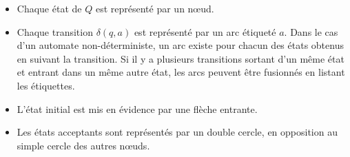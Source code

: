 \begin{itemize}
  \item Chaque état de $Q$ est représenté par un nœud.
  \item Chaque transition $\delta(q,a)$ est représenté par un arc étiqueté $a$. Dans le cas d'un automate non-déterministe, un arc existe pour chacun des états obtenus en suivant la transition. Si il y a plusieurs transitions sortant d'un même état et entrant dans un même autre état, les arcs peuvent être fusionnés en listant les étiquettes.
  \item L'état initial est mis en évidence par une flèche entrante.
  \item Les états acceptants sont représentés par un double cercle, en opposition au simple cercle des autres nœuds.
\end{itemize}

